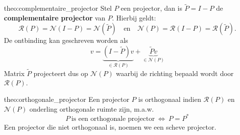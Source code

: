 \begin{theo}{theo:complementaire_projector}
    Stel $P$ een projector, dan is $\tilde{P} = I - P$ de \textbf{complementaire projector} van $P$. Hierbij geldt:
    \begin{equation*}
        \mathcal{R}(P) = \mathcal{N}(I-P) = \mathcal{N}(\tilde{P})  \quad \text{en} \quad \mathcal{N}(P) = \mathcal{R}(I-P) = \mathcal{R}(\tilde{P}).
    \end{equation*}
    De ontbinding kan geschreven worden als 
    \begin{equation*}
        v = \underbrace{(I - \tilde{P})v}_{\in \mathcal{R}(P)} + \underbrace{\tilde{P}v}_{\in \mathcal{N}(P)}
    \end{equation*}
    Matrix $\tilde{P}$ projecteert dus op $\mathcal{N}(P)$ waarbij de richting bepaald wordt door $\mathcal{R}(P)$.
\end{theo}

\begin{theo}{theo:orthogonale_projector}
    Een projector $P$ is orthogonaal indien $\mathcal{R}(P)$ en $\mathcal{N}(P)$ onderling orthogonale ruimte zijn, m\@.a\@.w\@.
    \begin{equation*}
        P \ \text{is een orthogonale projector} \ \Leftrightarrow \ P = P^*
    \end{equation*} 
    Een projector die niet orthogonaal is, noemen we een scheve projector.
\end{theo}


